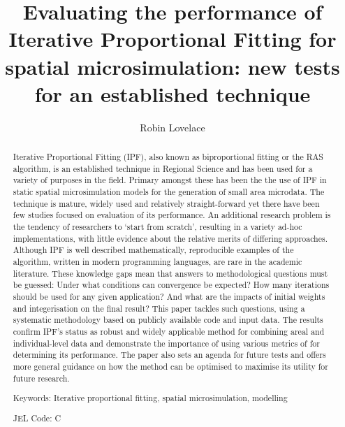 \documentclass[a4paper,10pt]{article}
\title{Evaluating the performance of Iterative Proportional Fitting for spatial microsimulation: new tests for an established technique}
\author{Robin Lovelace}
\begin{document}
\maketitle

\begin{abstract}
Iterative Proportional Fitting (IPF), also known as biproportional fitting or the RAS algorithm,
is an established technique in Regional Science and
has been used for a variety of purposes in the field. Primary amongst these has been
the the use of IPF in static spatial microsimulation models for the generation of small area microdata.  
The technique is mature, widely used and relatively straight-forward
yet there have been few studies focused on evaluation of its performance.
An additional research problem is the tendency of 
researchers to `start from scratch', resulting in a variety ad-hoc implementations,
with little evidence about the relative merits of differing approaches.
Although IPF is well described mathematically, reproducible
examples of the algorithm, written in modern programming languages, are rare in the academic literature.
These knowledge gaps mean that answers to methodological questions must be guessed:
Under what conditions can convergence be expected?
How many iterations should be used for any given application? 
And what are the impacts of initial weights and integerisation on the final result?
This paper tackles such questions, using a systematic methodology 
based on publicly available code and input data. 
The results confirm IPF's status as robust and widely applicable 
method for combining areal and individual-level data and demonstrate the importance
of using various metrics of for determining its performance.
The paper also sets an agenda for future tests and offers more general guidance on how
the method can be optimised to maximise its utility for future research.

Keywords: Iterative proportional fitting, spatial microsimulation, modelling

JEL Code: C
\end{abstract}
\end{document}
